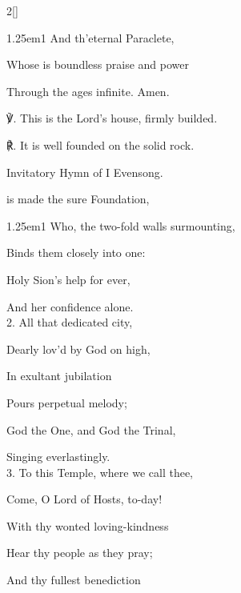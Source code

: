 \begin{paracol}{2}[]
\begin{hangparas}{1.25em}{1}
And th'eternal Paraclete,

Whose is boundless praise and power

Through the ages infinite. Amen.\\
\end{hangparas}

℣. This is the Lord's house, firmly builded.

℟. It is well founded on the solid rock.


\switchcolumn

\mattins


\begin{rubric}
	Invitatory Hymn of I Evensong.
\end{rubric}

\mattinsOfficeHymn\label{DedicationMattins}

 is made the sure Foundation,


\begin{hangparas}{1.25em}{1}
Who, the two-fold walls surmounting,

Binds them closely into one:

Holy Sion's help for ever,

And her confidence alone.\\

2. All that dedicated city,

Dearly lov'd by God on high,

In exultant jubilation

Pours perpetual melody;

God the One, and God the Trinal,

Singing everlastingly.\\

3. To this Temple, where we call thee,

Come, O Lord of Hosts, to-day!

With thy wonted loving-kindness

Hear thy people as they pray;

And thy fullest benediction


\end{hangparas}
\end{paracol}

